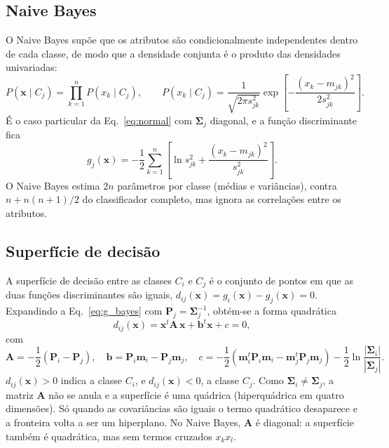 \documentclass[12pt,a4paper]{article}
\begin{document}
\subsection{Naive Bayes}

O Naive Bayes supõe que os atributos são condicionalmente independentes dentro de cada classe, de modo que a densidade conjunta é o produto das densidades univariadas:
\begin{equation}
  P(\mathbf{x} \mid C_j) = \prod_{k=1}^{n} P(x_k \mid C_j), \qquad
  P(x_k \mid C_j) = \frac{1}{\sqrt{2\pi s_{jk}^2}}\exp\left[-\frac{(x_k - m_{jk})^2}{2 s_{jk}^2}\right].
  \label{eq:naive}
\end{equation}
É o caso particular da Eq.~\eqref{eq:normal} com $\boldsymbol{\Sigma}_j$ diagonal, e a função discriminante fica
\begin{equation}
  g_j(\mathbf{x}) = -\frac{1}{2}\sum_{k=1}^{n}\left[\ln s_{jk}^2 + \frac{(x_k - m_{jk})^2}{s_{jk}^2}\right].
  \label{eq:g_naive}
\end{equation}
O Naive Bayes estima $2n$ parâmetros por classe (médias e variâncias), contra $n + n(n+1)/2$ do classificador completo, mas ignora as correlações entre os atributos.

\subsection{Superfície de decisão}\label{sec:superficie_teoria}

A superfície de decisão entre as classes $C_i$ e $C_j$ é o conjunto de pontos em que as duas funções discriminantes são iguais, $d_{ij}(\mathbf{x}) = g_i(\mathbf{x}) - g_j(\mathbf{x}) = 0$. Expandindo a Eq.~\eqref{eq:g_bayes} com $\mathbf{P}_j = \boldsymbol{\Sigma}_j^{-1}$, obtém-se a forma quadrática
\begin{equation}
  d_{ij}(\mathbf{x}) = \mathbf{x}^t\mathbf{A}\,\mathbf{x} + \mathbf{b}^t\mathbf{x} + c = 0,
  \label{eq:superficie}
\end{equation}
com
\begin{equation}
  \mathbf{A} = -\frac{1}{2}(\mathbf{P}_i - \mathbf{P}_j), \quad
  \mathbf{b} = \mathbf{P}_i\mathbf{m}_i - \mathbf{P}_j\mathbf{m}_j, \quad
  c = -\frac{1}{2}\left(\mathbf{m}_i^t\mathbf{P}_i\mathbf{m}_i - \mathbf{m}_j^t\mathbf{P}_j\mathbf{m}_j\right) - \frac{1}{2}\ln\frac{|\boldsymbol{\Sigma}_i|}{|\boldsymbol{\Sigma}_j|}.
  \label{eq:coeficientes}
\end{equation}
$d_{ij}(\mathbf{x}) > 0$ indica a classe $C_i$, e $d_{ij}(\mathbf{x}) < 0$, a classe $C_j$. Como $\boldsymbol{\Sigma}_i \ne \boldsymbol{\Sigma}_j$, a matriz $\mathbf{A}$ não se anula e a superfície é uma quádrica (hiperquádrica em quatro dimensões). Só quando as covariâncias são iguais o termo quadrático desaparece e a fronteira volta a ser um hiperplano. No Naive Bayes, $\mathbf{A}$ é diagonal: a superfície também é quadrática, mas sem termos cruzados $x_k x_l$.
\end{document}
